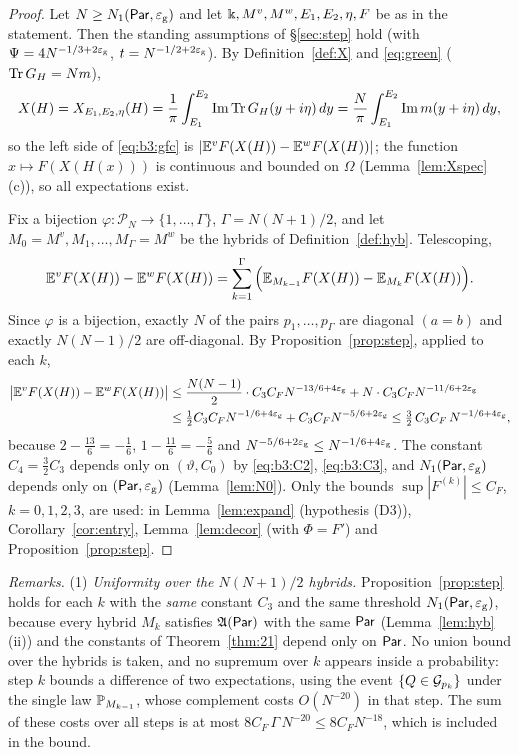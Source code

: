 \begin{proof}
Let $N\ge N_1(\Par,\eg)$ and let $\K,M^v,M^w,E_1,E_2,\eta,F$ be as in the statement. Then the standing assumptions of \S\ref{sec:step} hold (with $\Psi=4N^{-1/3+2\eg}$, $t=N^{-1/2+2\eg}$).
By Definition~\ref{def:X} and \eqref{eq:green} ($\tr G_H=Nm$),
\[
X(H)=X_{E_1,E_2,\eta}(H)=\frac1\pi\int_{E_1}^{E_2}\im\tr G_H(y+i\eta)\,dy=\frac N\pi\int_{E_1}^{E_2}\im m(y+i\eta)\,dy ,
\]
so the left side of \eqref{eq:b3:gfc} is $|\E^vF(X(H))-\E^wF(X(H))|$; the function $x\mapsto F(X(H(x)))$ is continuous and bounded on $\Omega$ (Lemma~\ref{lem:Xspec}(c)), so all expectations exist.

Fix a bijection $\varphi:\mathcal P_N\to\{1,\dots,\Gamma\}$, $\Gamma=N(N+1)/2$, and let $M_0=M^v,M_1,\dots,M_\Gamma=M^w$ be the hybrids of Definition~\ref{def:hyb}. Telescoping,
\[
\E^vF(X(H))-\E^wF(X(H))=\sum_{k=1}^{\Gamma}\Big(\E_{M_{k-1}}F(X(H))-\E_{M_k}F(X(H))\Big).
\]
Since $\varphi$ is a bijection, exactly $N$ of the pairs $p_1,\dots,p_\Gamma$ are diagonal $(a=b)$ and exactly $N(N-1)/2$ are off-diagonal. By Proposition~\ref{prop:step}, applied to each $k$,
\begin{align*}
\big|\E^vF(X(H))-\E^wF(X(H))\big|&\le\frac{N(N-1)}2\cdot C_3C_FN^{-13/6+4\eg}+N\cdot C_3C_FN^{-11/6+2\eg}\\
&\le\tfrac12C_3C_FN^{-1/6+4\eg}+C_3C_FN^{-5/6+2\eg}\le\tfrac32\,C_3C_F\,N^{-1/6+4\eg},
\end{align*}
because $2-\frac{13}6=-\frac16$, $1-\frac{11}6=-\frac56$ and $N^{-5/6+2\eg}\le N^{-1/6+4\eg}$. The constant $C_4=\frac32C_3$ depends only on $(\vartheta,C_0)$ by \eqref{eq:b3:C2}, \eqref{eq:b3:C3}, and $N_1(\Par,\eg)$ depends only on
$(\Par,\eg)$ (Lemma~\ref{lem:N0}). Only the bounds $\sup|F^{(k)}|\le C_F$, $k=0,1,2,3$, are used: in Lemma~\ref{lem:expand} (hypothesis \textup{(D3)}), Corollary~\ref{cor:entry}, Lemma~\ref{lem:decor} (with $\Phi=F'$) and
Proposition~\ref{prop:step}.
\end{proof}

\noindent\emph{Remarks.} (1) \emph{Uniformity over the $N(N+1)/2$ hybrids.} Proposition~\ref{prop:step} holds for each $k$ with the \emph{same} constant $C_3$ and the same threshold $N_1(\Par,\eg)$, because every
hybrid $M_k$ satisfies $\fA(\Par)$ with the same $\Par$ (Lemma~\ref{lem:hyb}(ii)) and the constants of Theorem~\ref{thm:21} depend only on $\Par$. No union bound over the hybrids is taken, and no supremum over $k$
appears inside a probability: step $k$ bounds a difference of two expectations, using the event $\{Q\in\cG_{p_k}\}$ under the single law $\P_{M_{k-1}}$, whose complement costs $O(N^{-20})$ in that step. The sum of
these costs over all steps is at most $8C_F\,\Gamma\,N^{-20}\le8C_FN^{-18}$, which is included in the bound.

